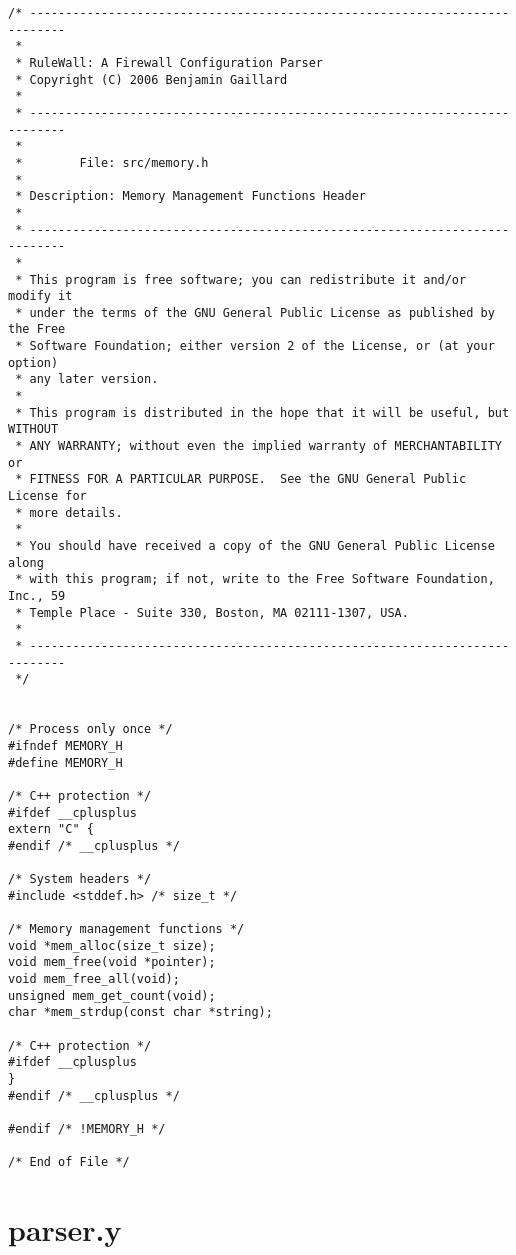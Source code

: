 \documentclass[a4paper,landscape,twocolumn,11pt]{article}
\begin{document}
\begin{lstlisting}
/* ---------------------------------------------------------------------------
 *
 * RuleWall: A Firewall Configuration Parser
 * Copyright (C) 2006 Benjamin Gaillard
 *
 * ---------------------------------------------------------------------------
 *
 *        File: src/memory.h
 *
 * Description: Memory Management Functions Header
 *
 * ---------------------------------------------------------------------------
 *
 * This program is free software; you can redistribute it and/or modify it
 * under the terms of the GNU General Public License as published by the Free
 * Software Foundation; either version 2 of the License, or (at your option)
 * any later version.
 *
 * This program is distributed in the hope that it will be useful, but WITHOUT
 * ANY WARRANTY; without even the implied warranty of MERCHANTABILITY or
 * FITNESS FOR A PARTICULAR PURPOSE.  See the GNU General Public License for
 * more details.
 *
 * You should have received a copy of the GNU General Public License along
 * with this program; if not, write to the Free Software Foundation, Inc., 59
 * Temple Place - Suite 330, Boston, MA 02111-1307, USA.
 *
 * ---------------------------------------------------------------------------
 */


/* Process only once */
#ifndef MEMORY_H
#define MEMORY_H

/* C++ protection */
#ifdef __cplusplus
extern "C" {
#endif /* __cplusplus */

/* System headers */
#include <stddef.h> /* size_t */

/* Memory management functions */
void *mem_alloc(size_t size);
void mem_free(void *pointer);
void mem_free_all(void);
unsigned mem_get_count(void);
char *mem_strdup(const char *string);

/* C++ protection */
#ifdef __cplusplus
}
#endif /* __cplusplus */

#endif /* !MEMORY_H */

/* End of File */
\end{lstlisting}

\bigskip\section*{parser.y}
\end{document}
